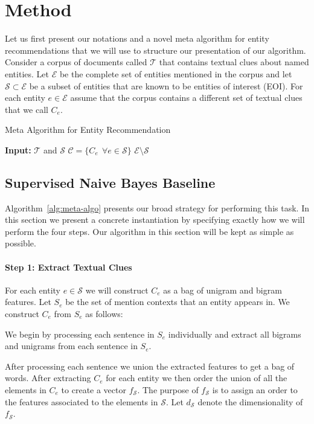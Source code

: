\documentclass{article}
\newcommand{\algoref}[1]{Algorithm~\ref{#1}}
\newcommand{\ems}{$\mathcal{E} \setminus \mathcal{S}$}
\begin{document}
\section{Method}
\label{sec:method}
Let us first present our notations and a novel meta algorithm for entity
recommendations that we will use to structure our presentation of our algorithm.
Consider a corpus of documents called $\mathcal{T}$ that contains textual clues about named
entities. Let $\mathcal{E}$ be the complete set of entities mentioned in the
corpus and let $\mathcal{S} \subset \mathcal{E}$ be a subset of entities that
are known to be entities of interest (EOI). For each entity $e \in \mathcal{E}$
assume that the corpus contains a different set of textual clues that we call
$C_e$.
\begin{algorithm}
  \label{alg:meta-algo}
  \caption{Meta Algorithm for Entity Recommendation}
  \begin{algorithmic}[1]
    \State \textbf{Input:} $\mathcal{T}$ and $\mathcal{S}$
     $\mathcal{C} = \{C_e\ \ \forall e \in \mathcal{S}\}$
     \ems
  \end{algorithmic}
\end{algorithm}

\subsection{Supervised Naive Bayes Baseline}
\label{ssec:baseline}
\algoref{alg:meta-algo} presents our broad strategy for performing this task. In
this section we present a concrete instantiation by specifying exactly how we
will perform the four steps. Our algorithm in this section will be kept as
simple as possible.
\paragraph{Step 1: Extract Textual Clues}
For each entity $e \in \mathcal{S}$ we will construct $C_e$ as a bag of unigram and
bigram features. Let $S_e$ be the set of mention contexts that an entity appears
in. We construct $C_e$ from $S_e$ as follows:

We begin by processing each sentence in $S_e$ individually and extract all
bigrams and unigrams from each sentence in $S_e$.

\noindent After processing each sentence we union the extracted features to
get a bag of words. After extracting $C_e$ for each entity we then order
the union of all the elements in $C_e$ to create a vector $f_{\mathcal{S}}$.
The purpose of $f_{\mathcal{S}}$ is to assign an order to the features
associated to the elements in $\mathcal{S}$. Let $d_{\mathcal{S}}$ denote the
dimensionality of $f_{\mathcal{S}}$.
\end{document}
